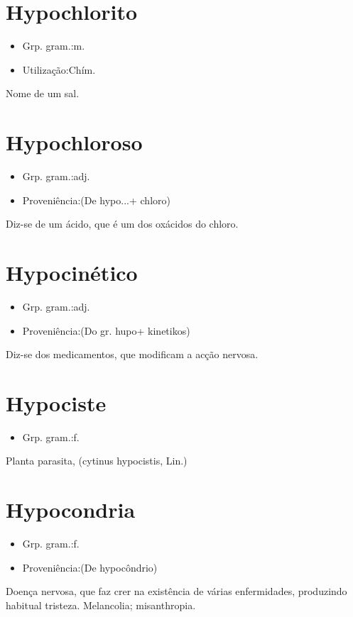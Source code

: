 \documentclass{article}
\begin{document}
\section{Hypochlorito}
\begin{itemize}
\item {Grp. gram.:m.}
\end{itemize}
\begin{itemize}
\item {Utilização:Chím.}
\end{itemize}
Nome de um sal.
\section{Hypochloroso}
\begin{itemize}
\item {Grp. gram.:adj.}
\end{itemize}
\begin{itemize}
\item {Proveniência:(De \textunderscore hypo...\textunderscore  + \textunderscore chloro\textunderscore )}
\end{itemize}
Diz-se de um ácido, que é um dos oxácidos do chloro.
\section{Hypocinético}
\begin{itemize}
\item {Grp. gram.:adj.}
\end{itemize}
\begin{itemize}
\item {Proveniência:(Do gr. \textunderscore hupo\textunderscore  + \textunderscore kinetikos\textunderscore )}
\end{itemize}
Diz-se dos medicamentos, que modificam a acção nervosa.
\section{Hypociste}
\begin{itemize}
\item {Grp. gram.:f.}
\end{itemize}
Planta parasita, (\textunderscore cytinus hypocistis\textunderscore , Lin.)
\section{Hypocondria}
\begin{itemize}
\item {Grp. gram.:f.}
\end{itemize}
\begin{itemize}
\item {Proveniência:(De \textunderscore hypocôndrio\textunderscore )}
\end{itemize}
Doença nervosa, que faz crer na existência de várias enfermidades, produzindo habitual tristeza.
Melancolia; misanthropia.
\end{document}
